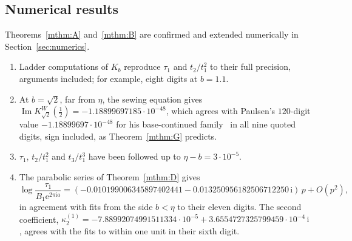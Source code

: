 \documentclass[11pt]{amsart}
\theoremstyle{definition}
\newcommand{\Kk}{K}
\newcommand{\eee}{\mathrm{e}}
\newcommand{\ii}{\mathrm{i}}
\begin{document}
\subsection*{Numerical results}
Theorems~\ref{mthm:A} and~\ref{mthm:B} are confirmed and extended numerically
in Section~\ref{sec:numerics}.
\begin{enumerate}
\item Ladder computations of $\Kk_b$ reproduce $\tau_1$ and $t_2/t_1^2$ to their
  full precision, arguments included; for example, eight digits at $b=1.1$.
\item At $b=\sqrt2$, far from $\eta$, the sewing equation gives
  $\operatorname{Im}\Kk^W_{\sqrt2}(\tfrac12)=-1.18899697185\cdot10^{-48}$, which agrees with
  Paulsen's $120$-digit value $-1.18899697\cdot10^{-48}$ for his base-continued
  family~\cite[\S6]{Paulsen2019} in all nine quoted digits, sign included, as
  Theorem~\ref{mthm:G} predicts.
\item $\tau_1$, $t_2/t_1^2$ and $t_3/t_1^3$ have been followed up to
  $\eta-b=3\cdot10^{-5}$.
\item The parabolic series of Theorem~\ref{mthm:D} gives
  \[
   \log\frac{\tau_1}{B_1\eee^{2\pi\ii a}}=(-0.010199006345897402441-0.013250956182506712250\,\ii)\,p+O(p^{2}),
  \]
  in agreement with fits from the side $b<\eta$ to their eleven digits.  The
  second coefficient,
  $\kappa^{(1)}_2=-7.88992074991511334\cdot10^{-5}+3.6554727325799459\cdot10^{-4}\,\ii$,
  agrees with the fits to within one unit in their sixth digit.
\end{enumerate}
\end{document}

